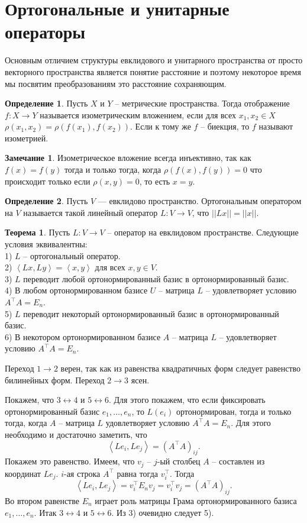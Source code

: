 \documentclass[10pt,a4paper,oneside]{book} %
\theoremstyle{definition}
\newtheorem*{rem}{Замечание}
\newtheorem*{defn}{Определение}
\newtheorem{thm}{Теорема}
\def\lan{\left\langle }
\def\ran{\right\rangle}
\def\thrm{\begin{thm}}
\def\ethrm{\end{thm}}
\def\dfn{\begin{defn}}
\def\edfn{\end{defn}}
\def\rm{\begin{rem}}
\def\erm{\end{rem}}
\begin{document}
\section{Ортогональные и унитарные операторы}

Основным отличием структуры евклидового и унитарного пространства от просто векторного пространства является понятие расстояние и поэтому некоторое время мы посвятим преобразованиям это расстояние сохраняющим.

\dfn Пусть $X$ и $Y$ -- метрические пространства. Тогда отображение $f\colon X \to Y$ называется изометрическим вложением, если для всех $x_1,x_2 \in X$ $\rho(x_1,x_2)=\rho(f(x_1),f(x_2))$. Если к тому же $f$ -- биекция, то $f$ называют изометрией.
\edfn

\rm Изометрическое вложение всегда инъективно, так как $f(x)=f(y)$ тогда и только тогда, когда $\rho(f(x),f(y))=0$ что происходит только если $\rho(x,y)=0$, то есть $x=y$.
\erm


\dfn Пусть $V$ --- евклидово пространство. Ортогональным оператором на $V$ называется такой линейный оператор $L \colon V \to V$, что $||Lx||=
||x||$.
\edfn

\thrm Пусть $L\colon V \to V$ -- оператор на евклидовом пространстве. Следующие условия эквивалентны:\\
1) $L$ -- ортогональный оператор.\\
2) $\lan Lx,Ly\ran=\lan x,y \ran$ для всех $x,y \in V$.\\
3) $L$ переводит любой ортонормированный базис в ортонормированный базис.\\
4) В любом ортонормированном базисе $U$ -- матрица $L$ -- удовлетворяет условию $A^{\top} A = E_n$.\\
5) $L$ переводит некоторый ортонормированный базис в ортонормированный базис.\\
6) В некотором ортонормированном базисе $A$ -- матрица $L$ --  удовлетворяет условию $A^{\top} A = E_n$.
\ethrm
\proof
Переход $1\to 2$ верен, так как из равенства квадратичных форм следует равенство билинейных форм. Переход $2\to 3$ ясен.


Покажем, что $3 \leftrightarrow 4$ и $5 \leftrightarrow 6$. Для этого покажем, что если фиксировать ортонормированный базис $e_1,\dots, e_n$, то $L(e_i)$ ортонормирован, тогда и только тогда, когда $A$ -- матрица $L$ удовлетворяет условию $A^{\top}A=E_n$. Для этого необходимо и достаточно заметить, что $$\lan Le_i, Le_j \ran = (A^{\top}A)_{ij}.$$
Покажем это равенство. Имеем, что $v_j$ -- $j$-ый столбец $A$ -- составлен из координат $Le_j$. $i$-ая строка $A^{\top}$ равна тогда $v_i^{\top}$. Тогда $$\lan Le_i,Le_j\ran = v_i^{\top}E_n v_j= v_i^{\top}v_j= (A^{\top}A)_{ij}.$$
Во втором равенстве $E_n$ играет роль матрицы Грама ортонормированного базиса $e_1,\dots, e_n$.
Итак $3 \leftrightarrow 4$ и $5 \leftrightarrow 6$. Из 3) очевидно следует 5).
\end{document}

